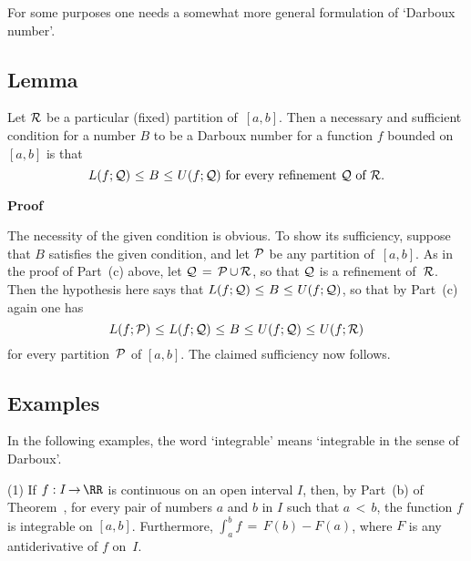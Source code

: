 \VV

        For some purposes one needs a somewhat more general formulation of `Darboux number'.

\V

        \subsection{\small{{\bf Lemma}}}
        \label{LemmaH20.34}

\V

        Let ${\cal R}$ be a particular (fixed) partition of~$[a,b]$. Then a necessary and sufficient condition
    for a number $B$ to be a Darboux number for a function $f$ bounded on $[a,b]$ is that
        \begin{displaymath}
        L(f;{\cal Q})\,\,{\leq}\,\,B\,\,{\leq}\,\,U(f;{\cal Q}) \mbox{ for every refinement ${\cal Q}$ of~${\cal R}$}.
        \end{displaymath}

\V

        {\bf Proof}

\V

        The necessity of the given condition is obvious. To show its sufficiency,
    suppose that $B$ satisfies the given condition, and let ${\cal P}$ be any partition of~$[a,b]$.
    As in the proof of Part~(c) above, let ${\cal Q} \,=\, {\cal P}\,{\cup}\,{\cal R}$, so that ${\cal Q}$ is a refinement of~${\cal R}$.
    Then the hypothesis here says that $L(f;{\cal Q})\,\,{\leq}\,\,B\,\,{\leq}\,\,U(f;{\cal Q})$,
    so that by Part~(c) again one has
        \begin{displaymath}
        L(f;{\cal P})\,\,{\leq}\,\,L(f;{\cal Q})\,\,{\leq}\,\,B\,\,{\leq}\,\,U(f;{\cal Q})\,\,{\leq}\,\,U(f;{\cal R})
        \end{displaymath}
    for every partition~${\cal P}$ of $[a,b]$. The claimed sufficiency now follows.

\VV

        \subsection{\small{{\bf Examples}}}
        \label{ExampH20.30}

\V
        In the following examples, the word `integrable' means `integrable in the sense of Darboux'.

\V

        (1) If $f:I \,{\rightarrow}\, {\RR}$ is continuous on an open interval $I$, then, by Part~(b) of Theorem~, for every pair of numbers $a$ and $b$ in $I$ such that $a\,<\,b$,
    the function $f$ is integrable on $[a,b]$. Furthermore, ${\displaystyle \int_{a}^{b} f \,=\, F(b)-F(a)}$, where $F$ is any antiderivative of $f$ on~$I$.

